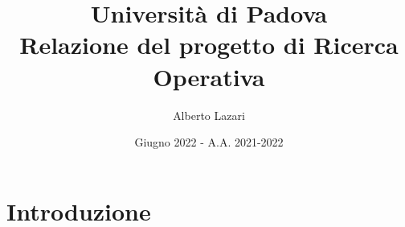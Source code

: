 \documentclass[12pt, a4paper]{article}
\title{\textbf{Università di Padova \\ Relazione del progetto di Ricerca Operativa}}
\author{Alberto Lazari}
\date{Giugno 2022 - A.A. 2021-2022}
\begin{document}
	\maketitle
	\pagebreak

	\tableofcontents
	\pagebreak

	\section{Introduzione}
	
\end{document}

